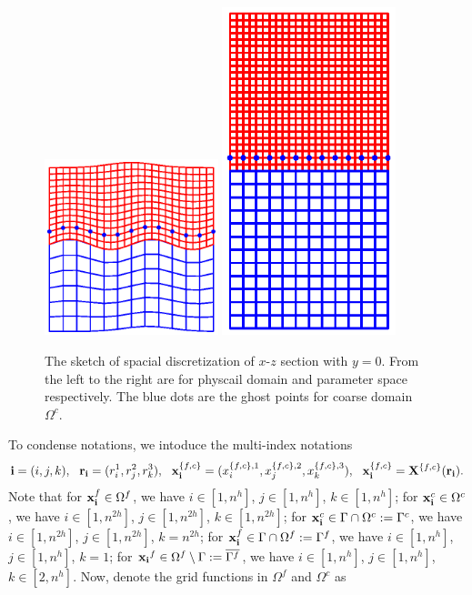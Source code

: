 \begin{figure}[htbp]
	\centering
	\includegraphics[width=0.45\textwidth,trim={3.4cm 0.8cm 3.2cm 0.5cm}, clip]{physical_section_discretization.eps}
	\includegraphics[width=0.45\textwidth,trim={3.4cm 0.8cm 3.2cm 0.5cm}, clip]{parameter_section_discretization.eps}
	\caption{The sketch of spacial discretization of $x$-$z$ section with $y = 0$. From the left to the right are for physcail domain and parameter space respectively. The blue dots are the ghost points for coarse domain $\Omega^c$.}\label{section_discretization}
\end{figure}
 To condense notations, we intoduce the multi-index notations
\[{\bf i} = (i,j,k),\ \ {\bf r}_{\bf i} = (r^1_i,r^2_j,r^3_k),\ \ {\bf x}^{\{f,c\}}_{\bf i} = (x^{\{f,c\},1}_i,x^{\{f,c\},2}_j,x^{\{f,c\},3}_k),\ \ {\bf x}_{\bf i}^{\{f,c\}} = {\bf X}^{\{f,c\}}({\bf r}_{\bf i}).\]
Note that for ${\bf x}^f_{\bf i}\in\Omega^f$, we have $i\in[1,n^h]$, $j\in[1,n^h]$, $k\in[1,n^h]$; for ${\bf x}^c_{\bf i}\in\Omega^c$, we have $i\in[1,n^{2h}]$, $j\in[1,n^{2h}]$, $k\in[1,n^{2h}]$; for ${\bf x}_{\bf i}^c \in \Gamma\cap\Omega^c := \Gamma^c$, we have $i\in[1,n^{2h}]$, $j\in[1,n^{2h}]$, $k = n^{2h}$; for ${\bf x}_{\bf i}^f \in \Gamma\cap\Omega^f := \Gamma^f$, we have $i\in[1,n^h]$, $j\in[1,n^h]$, $k = 1$; for ${\bf x_i}^f\in \Omega^f \setminus \Gamma := \overline{\Gamma^f}$, we have $i\in[1,n^h]$, $j\in[1,n^h]$, $k\in[2,n^h]$. Now, denote the grid functions in $\Omega^f$ and $\Omega^c$ as
